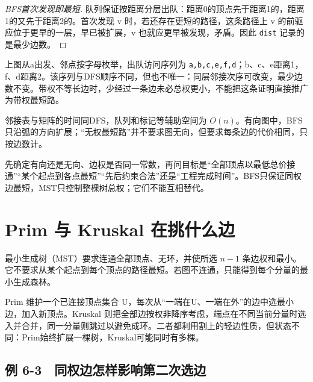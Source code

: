 \begin{proof}[BFS首次发现即最短]

队列保证按距离分层出队：距离0的顶点先于距离1的，距离1的又先于距离2的。首次发现 v 时，若还存在更短的路径，这条路径上 v 的前驱应位于更早的一层，早已被扩展，v 也就应更早被发现，矛盾。因此 \texttt{dist} 记录的是最少边数。

\end{proof}

上图从a出发、邻点按字母枚举，出队访问序列为 \texttt{a,\allowbreak{}b,\allowbreak{}c,\allowbreak{}e,\allowbreak{}f,\allowbreak{}d}；b、c、e距离1，f、d距离2。该序列与DFS顺序不同，但也不唯一：同层邻接次序可改变，最少边数不变。带权不等长边时，少经过一条边未必总权更小，不能把这条证明直接推广为带权最短路。

邻接表与矩阵的时间同DFS，队列和标记等辅助空间为 \(O(n)\)。有向图中，BFS只沿弧的方向扩展；``无权最短路''并不要求图无向，但要求每条边的代价相同，只按边数计。

\begin{methodbox}[把题意翻译成图算法的目标]

先确定有向还是无向、边权是否同一常数，再问目标是``全部顶点以最低总价接通''``某个起点到各点最短''``先后约束合法''还是``工程完成时间''。BFS只保证同权边最短，MST只控制整棵树总权；它们不能互相替代。

\end{methodbox}

\section{Prim 与 Kruskal 在挑什么边}\label{DS06-06}

最小生成树（MST）要求连通全部顶点、无环，并使所选 \(n-1\) 条边权和最小。它不要求从某个起点到每个顶点的路径最短。若图不连通，只能得到每个分量的最小生成森林。

Prim 维护一个已连接顶点集合 U，每次从``一端在U、一端在外''的边中选最小边，加入新顶点。Kruskal 则把全部边按权非降序考虑，端点在不同当前分量时选入并合并，同一分量则跳过以避免成环。二者都利用割上的轻边性质，但状态不同：Prim始终扩展一棵树，Kruskal可能同时有多棵。

\subsection{例 6-3　同权边怎样影响第二次选边}\label{DS06-ex3}

